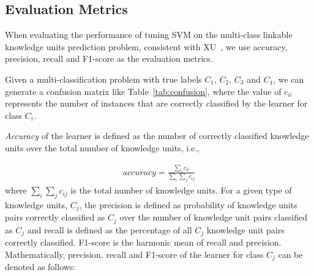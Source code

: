 \documentclass[sigconf]{acmart}
\theoremstyle{break}
\newcommand{\tab}[1]{Table~\ref{tab:#1}}
\begin{document}
\subsection{Evaluation Metrics}


When evaluating the performance of tuning SVM on the
multi-class linkable knowledge units prediction problem,
consistent with XU~\cite{xu2016predicting}, we use accuracy, precision, recall and F1-score
as the evaluation metrics.

\begin{table}[htp]
\caption {Confusion Matrix.}
\scriptsize
{}

\label{tab:confusion}
\end{table}


Given a multi-classification problem with true labels $C_1$, 
$C_2$, $C_3$ and $C_4$, we can generate a confusion matrix like \tab{confusion}, 
where the value of $c_{ii}$ represents the number of instances that are correctly classified
by the learner for class $C_i$. 

{\it Accuracy} of the learner is defined as the number of  correctly
classified knowledge units over the total number of knowledge units, i.e.,

{\[
\begin{array}{ll}
accuracy = \frac{\sum_i c_{ii}}{\sum_{i}\sum_{j}c_{ij}}
\end{array}
\]}
where ${\sum_{i}\sum_{j}c_{ij}}$ is the total number of knowledge units.
For a given type of knowledge units, $C_j$, the  precision is defined as probability of
knowledge units pairs correctly classified as $C_j$ over the number of knowledge unit pairs classified as $C_j$ and
 recall is defined as the percentage of all $C_j$ knowledge unit pairs correctly classified. F1-score is the harmonic mean of
 recall and precision. Mathematically,
  precision, recall and  F1-score of 
the learner for class $C_j$ can be denoted as follows:
\end{document}
